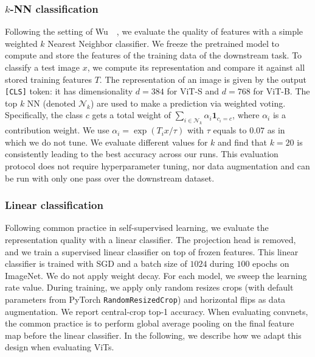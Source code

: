 \subsubsection{$k$-NN classification}
Following the setting of Wu~\etal~\cite{wu2018unsupervised}, we evaluate the quality of features with a simple weighted $k$ Nearest Neighbor classifier.
We freeze the pretrained model to compute and store the features of the training data of the downstream task.
To classify a test image $x$, we compute its representation and compare it against all stored training features $T$.
The representation of an image is given by the output \texttt{[CLS]} token: it has dimensionality $d=384$ for ViT-S and $d=768$ for ViT-B.
The top $k$ NN (denoted $\mathcal{N}_k$) are used to make a prediction via weighted voting.
Specifically, the class $c$ gets a total weight of $\sum_{i \in \mathcal{N}_k} \alpha_i \mathbf{1}_{c_i = c}$, where $\alpha_i$ is a contribution weight.
We use $\alpha_i = \exp(T_i x / \tau)$ with $\tau$ equals to $0.07$ as in~\cite{wu2018unsupervised} which we do not tune.
We evaluate different values for $k$ and find that $k=20$ is consistently leading to the best accuracy across our runs.
This evaluation protocol does not require hyperparameter tuning, nor data augmentation and can be run with only one pass over the downstream dataset.

\subsubsection{Linear classification}
Following common practice in self-supervised learning, we evaluate the representation quality with a linear classifier.
The projection head is removed, and we train a supervised linear classifier on top of frozen features.
This linear classifier is trained with SGD and a batch size of $1024$ during $100$ epochs on ImageNet.
We do not apply weight decay.
For each model, we sweep the learning rate value.
During training, we apply only random resizes crops (with default parameters from PyTorch \texttt{RandomResizedCrop}) and horizontal flips as data augmentation.
We report central-crop top-1 accuracy.
When evaluating convnets, the common practice is to perform global average pooling on the final feature map before the linear classifier.
In the following, we describe how we adapt this design when evaluating ViTs.

